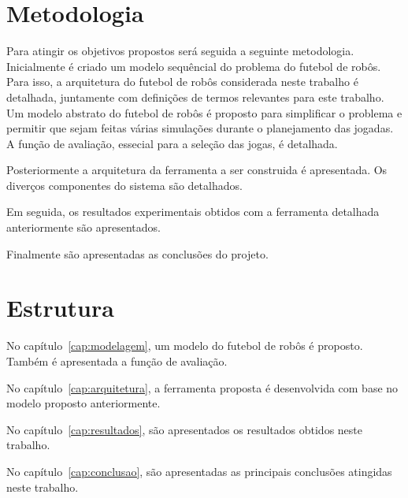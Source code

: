 \section{Metodologia}

Para atingir os objetivos propostos será seguida a seguinte metodologia.
Inicialmente é criado um modelo sequêncial do problema do futebol de robôs.
Para isso, a arquitetura do futebol de robôs considerada neste trabalho é
detalhada, juntamente com definições de termos relevantes para este trabalho.
Um modelo abstrato do futebol de robôs é proposto para simplificar o problema
e permitir que sejam feitas várias simulações durante o planejamento das
jogadas. A função de avaliação, essecial para a seleção das jogas, é detalhada.

Posteriormente a arquitetura da ferramenta a ser construida é apresentada.
Os diverços componentes do sistema são detalhados.

Em seguida, os resultados experimentais obtidos com a ferramenta detalhada
anteriormente são apresentados.

Finalmente são apresentadas as conclusões do projeto.

\section{Estrutura}

No capítulo~\ref{cap:modelagem}, um modelo do futebol de robôs é proposto.
Também é apresentada a função de avaliação.

No capítulo~\ref{cap:arquitetura}, a ferramenta proposta é desenvolvida com
base no modelo proposto anteriormente.

No capítulo~\ref{cap:resultados}, são apresentados os resultados obtidos
neste trabalho.

No capítulo~\ref{cap:conclusao}, são apresentadas as principais conclusões
atingidas neste trabalho.

